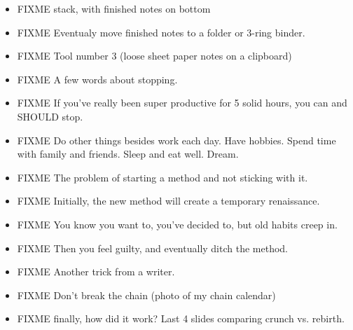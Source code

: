 \documentclass[12pt]{article}
\begin{document}
{\begin{itemize}
\item FIXME  stack, with finished notes on bottom

\item FIXME  Eventualy move finished notes to a folder or 3-ring binder.

\item FIXME  Tool number 3 (loose sheet paper notes on a clipboard)


\item FIXME A few words about stopping.  

\item FIXME If you've really been super productive for 5 solid hours, you can and SHOULD stop.

\item FIXME Do other things besides work each day.  Have hobbies.  Spend time with family and friends.  Sleep and eat well.  Dream.



\item FIXME The problem of starting a method and not sticking with it.

\item FIXME Initially, the new method will create a temporary renaissance.

\item FIXME You know you want to, you've decided to, but old habits creep in.

\item FIXME Then you feel guilty, and eventually ditch the method.

\item FIXME Another trick from a writer.

\item FIXME Don't break the chain (photo of my chain calendar)

\item FIXME finally, how did it work?  Last 4 slides comparing crunch vs. rebirth.



\end{itemize}

}
\end{document}
